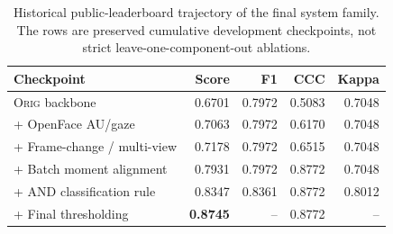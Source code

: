 \begin{table}[!t]
\centering
\caption{Historical public-leaderboard trajectory of the final system family.
The rows are preserved cumulative development checkpoints, not strict
leave-one-component-out ablations.}
\label{tab:stepwise_components}
\footnotesize
\setlength{\tabcolsep}{2.5pt}
\renewcommand{\arraystretch}{1.05}
\begin{tabular}{p{}rrrr}
\toprule
\textbf{Checkpoint} & \textbf{Score} & \textbf{F1} & \textbf{CCC} & \textbf{Kappa} \\
\midrule
\textsc{Orig} backbone       & 0.6701 & 0.7972 & 0.5083 & 0.7048 \\
+ OpenFace AU/gaze           & 0.7063 & 0.7972 & 0.6170 & 0.7048 \\
+ Frame-change / multi-view  & 0.7178 & 0.7972 & 0.6515 & 0.7048 \\
+ Batch moment alignment     & 0.7931 & 0.7972 & 0.8772 & 0.7048 \\
+ AND classification rule    & 0.8347 & 0.8361 & 0.8772 & 0.8012 \\
+ Final thresholding         & \textbf{0.8745} & -- & 0.8772 & -- \\
\bottomrule
\end{tabular}
\end{table}
